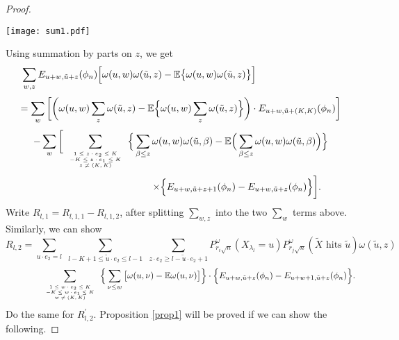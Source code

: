 \documentclass[11pt]{amsart}
\begin{document}
\begin{proof}
\begin{center} \texttt{[image: sum1.pdf]} \end{center}
Using summation by parts on $z$, we get
\[\sum_{w,z} E_{u+w, \tilde{u}+z} (\phi_n) 
   \Big{[} \omega(u,w)\omega(\tilde{u},z)-
     \mathbb{E}\big{\lbrace}\omega(u,w)\omega(\tilde{u},z)\big{\rbrace}\Big{]}
\hspace{3cm}\]
\[ = \sum_{w} \bigg{[}\bigg{(} \omega(u,w)\sum_{z}\omega(\tilde{u},z) - \mathbb{E} \Big{\lbrace} \omega(u,w)\sum_{z}\omega(\tilde{u},z)\Big{\rbrace} \bigg{)} \cdot E_{u+w,\tilde{u}+(K,K)}(\phi_n) \bigg{]} \]
\[ - \sum_{w} \bigg{[} \sum_{  \begin{tiny} \begin{array}{c}1\le  z\cdot e_2  \leq K \\
 -K \le  z\cdot e_1  \leq K \\ z \ne (K,K) \end{array}\end{tiny}} \Big{\lbrace} \sum_{\beta \leq z} \omega(u,w)\omega(\tilde{u}, \beta ) -\mathbb{E}\Big{(}\sum_{\beta \leq z} \omega(u,w)\omega(\tilde{u}, \beta )\Big{)}  \Big{\rbrace} \]
\[ \hspace{2cm} \qquad \qquad \qquad  \times \Big{\lbrace}E_{u+w,\tilde{u}+z+1}(\phi_n) - E_{u+w,\tilde{u}+z}(\phi_n )
  \Big{\rbrace}  \bigg{]}.
\]
Write $R_{l,1}= R_{l,1,1}-R_{l,1,2}$, after splitting $\sum_{w,z}$ into the two $\sum_w$ terms above. Similarly, we can show 
\[ R_{l,2}= \sum_{u \cdot e_2=l}\,\, \sum_{ l-K+1 \leq \tilde{u} \cdot e_2 \leq l-1} \,\,\sum_{ z \cdot e_2 \geq l- \tilde{u} \cdot e_2 +1 } P_{r_i \sqrt{n}}^{\omega}(X_{\lambda_l }=u)P_{r_j \sqrt{n}}^{\omega}(\tilde{X} \mbox{ hits } \tilde{u})\omega(\tilde{u},z) \]              
\[\qquad \qquad  \sum_{ \begin{tiny} \begin{array}{c}1\le  w\cdot e_2  \leq K \\
 -K \le  w\cdot e_1  \leq K \\ w \ne (K,K) \end{array}\end{tiny} }\Big{\lbrace} \sum_{\nu \leq w}\big{[}\omega(u,\nu) - \mathbb{E} \omega(u,\nu)\big{]}   \Big{\rbrace} \cdot \Big{\lbrace}E_{u+w,\tilde{u}+z}(\phi_n) - E_{u+w+1,\tilde{u}+z}(\phi_n) \Big{\rbrace}.\]
Do the same for $R_{l,2}^{'}$. Proposition \ref{prop1} will be proved if we can show the following.
\end{proof}

\bigskip
\end{document}

